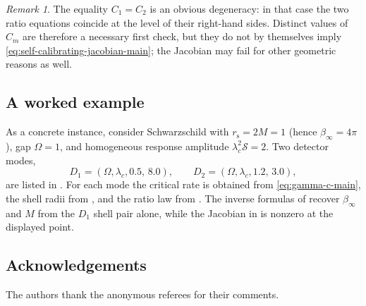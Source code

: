 \documentclass[11pt]{amsart}
\numberwithin{equation}{section}
\theoremstyle{remark}
\newtheorem{remark}[theorem]{Remark}
\begin{document}
\begin{remark}\label{rem:jacobian-main}
The equality $C_1=C_2$ is an obvious degeneracy: in that case the two ratio equations coincide at the level of their right-hand sides. Distinct values of $C_m$ are therefore a necessary first check, but they do not by themselves imply \eqref{eq:self-calibrating-jacobian-main}; the Jacobian may fail for other geometric reasons as well.
\end{remark}

\subsection{A worked example}\label{subsec:worked-example}

As a concrete instance, consider Schwarzschild with $r_{\mathrm s}=2M=1$ (hence $\beta_\infty=4\pi$), gap $\Omega=1$, and homogeneous response amplitude $\lambda_c^2\mathcal S=2$. Two detector modes,
\[
D_1=(\Omega,\lambda_c,0.5,\,8.0),
\qquad
D_2=(\Omega,\lambda_c,1.2,\,3.0),
\]
are listed in . For each mode the critical rate is obtained from \eqref{eq:gamma-c-main}, the shell radii from , and the ratio law from . The inverse formulas of  recover $\beta_\infty$ and $M$ from the $D_1$ shell pair alone, while the Jacobian in  is nonzero at the displayed point.



\subsection*{Acknowledgements}

The authors thank the anonymous referees for their comments.


\end{document}
